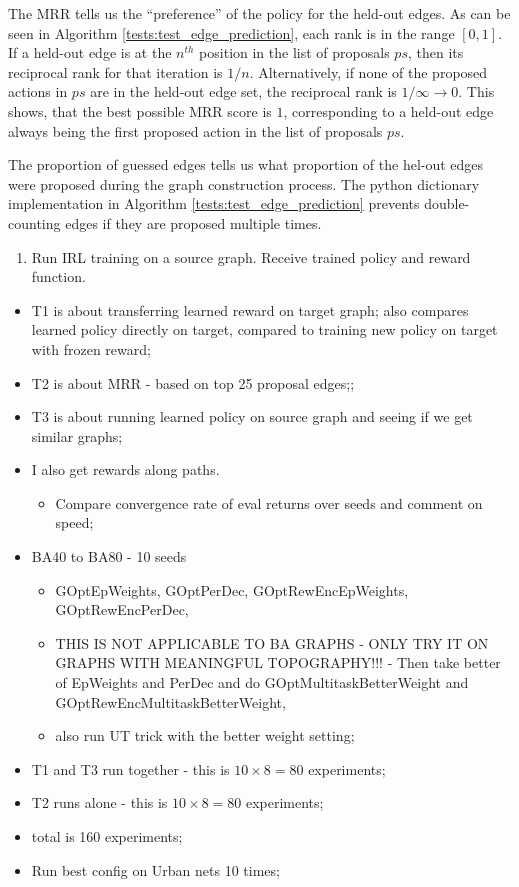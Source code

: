 \documentclass{report}
\numberwithin{equation}{section}
\numberwithin{figure}{section}
\numberwithin{table}{section}
\numberwithin{algorithm}{section}
\begin{document}
The MRR tells us the ``preference'' 
of the policy for the held-out edges. As can be seen in Algorithm 
\ref{tests:test_edge_prediction}, each rank is in the range $[0, 1]$. 
If a held-out edge is at the $n^{th}$ position in the list of proposals 
$ps$, then its reciprocal rank for that iteration is $1/n$. Alternatively, 
if none of the proposed actions in $ps$ are in the held-out edge set, 
the reciprocal rank is $1/\infty\rightarrow 0$. This shows, that the 
best possible MRR score is $1$, corresponding to a held-out edge 
always being the first proposed action in the list of proposals $ps$.

The proportion of guessed edges tells us what proportion of the 
hel-out edges were proposed during the graph construction process. 
The python dictionary implementation in Algorithm \ref{tests:test_edge_prediction} 
prevents double-counting edges if they are proposed multiple times.

\begin{enumerate}
  \item Run IRL training on a source graph. Receive trained policy 
  and reward function.
\end{enumerate}
\begin{itemize}
  \item T1 is about transferring learned reward on target graph;
  also compares learned policy directly on target, compared to 
  training new policy on target with frozen reward;
  \item T2 is about MRR - based on top 25 proposal edges;;
  \item T3 is about running learned policy on source graph and 
  seeing if we get similar graphs;
  \item I also get rewards along paths.
  \begin{itemize}
    \item Compare convergence rate of eval returns over seeds
      and comment on speed;
  \end{itemize}
  \item BA40 to BA80 - 10 seeds
  \begin{itemize}
    \item GOptEpWeights, GOptPerDec, 
      GOptRewEncEpWeights, GOptRewEncPerDec,
    \item THIS IS NOT APPLICABLE TO BA GRAPHS - ONLY TRY IT ON GRAPHS 
      WITH MEANINGFUL TOPOGRAPHY!!! - Then take better of EpWeights and PerDec and do 
      GOptMultitaskBetterWeight and GOptRewEncMultitaskBetterWeight,
    \item also run UT trick with the better weight setting;
  \end{itemize}
    
  \item T1 and T3 run together - this is $10\times 8=80$ experiments;
  \item T2 runs alone - this is $10\times 8=80$ experiments;
  \item total is 160 experiments;
  \item  Run best config on Urban nets 10 times;
\end{itemize}
\end{document}
